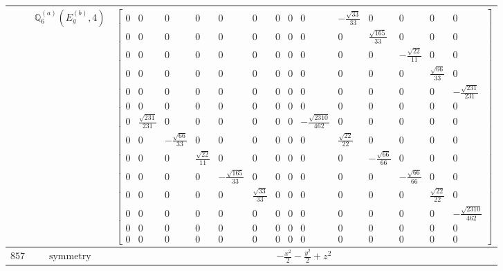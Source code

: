 \documentclass[fleqn,8pt,landscape]{jsarticle}
\begin{document}
\begin{longtable}{ccc}
$  $ & $ \mathbb{Q}_{6}^{(a)}(E_{g}^{(b)},4) $ & $ \begin{bmatrix} 0 & 0 & 0 & 0 & 0 & 0 & 0 & 0 & 0 & - \frac{\sqrt{33}}{33} & 0 & 0 & 0 & 0 \\ 0 & 0 & 0 & 0 & 0 & 0 & 0 & 0 & 0 & 0 & \frac{\sqrt{165}}{33} & 0 & 0 & 0 \\ 0 & 0 & 0 & 0 & 0 & 0 & 0 & 0 & 0 & 0 & 0 & - \frac{\sqrt{22}}{11} & 0 & 0 \\ 0 & 0 & 0 & 0 & 0 & 0 & 0 & 0 & 0 & 0 & 0 & 0 & \frac{\sqrt{66}}{33} & 0 \\ 0 & 0 & 0 & 0 & 0 & 0 & 0 & 0 & 0 & 0 & 0 & 0 & 0 & - \frac{\sqrt{231}}{231} \\ 0 & 0 & 0 & 0 & 0 & 0 & 0 & 0 & 0 & 0 & 0 & 0 & 0 & 0 \\ 0 & \frac{\sqrt{231}}{231} & 0 & 0 & 0 & 0 & 0 & 0 & - \frac{\sqrt{2310}}{462} & 0 & 0 & 0 & 0 & 0 \\ 0 & 0 & - \frac{\sqrt{66}}{33} & 0 & 0 & 0 & 0 & 0 & 0 & \frac{\sqrt{22}}{22} & 0 & 0 & 0 & 0 \\ 0 & 0 & 0 & \frac{\sqrt{22}}{11} & 0 & 0 & 0 & 0 & 0 & 0 & - \frac{\sqrt{66}}{66} & 0 & 0 & 0 \\ 0 & 0 & 0 & 0 & - \frac{\sqrt{165}}{33} & 0 & 0 & 0 & 0 & 0 & 0 & - \frac{\sqrt{66}}{66} & 0 & 0 \\ 0 & 0 & 0 & 0 & 0 & \frac{\sqrt{33}}{33} & 0 & 0 & 0 & 0 & 0 & 0 & \frac{\sqrt{22}}{22} & 0 \\ 0 & 0 & 0 & 0 & 0 & 0 & 0 & 0 & 0 & 0 & 0 & 0 & 0 & - \frac{\sqrt{2310}}{462} \\ 0 & 0 & 0 & 0 & 0 & 0 & 0 & 0 & 0 & 0 & 0 & 0 & 0 & 0 \\ 0 & 0 & 0 & 0 & 0 & 0 & 0 & 0 & 0 & 0 & 0 & 0 & 0 & 0 \end{bmatrix} $ \\ \hline
$ 857 $ & $ \text{symmetry} $ & $ - \frac{x^{2}}{2} - \frac{y^{2}}{2} + z^{2} $ \\

\end{longtable}
\end{document}
